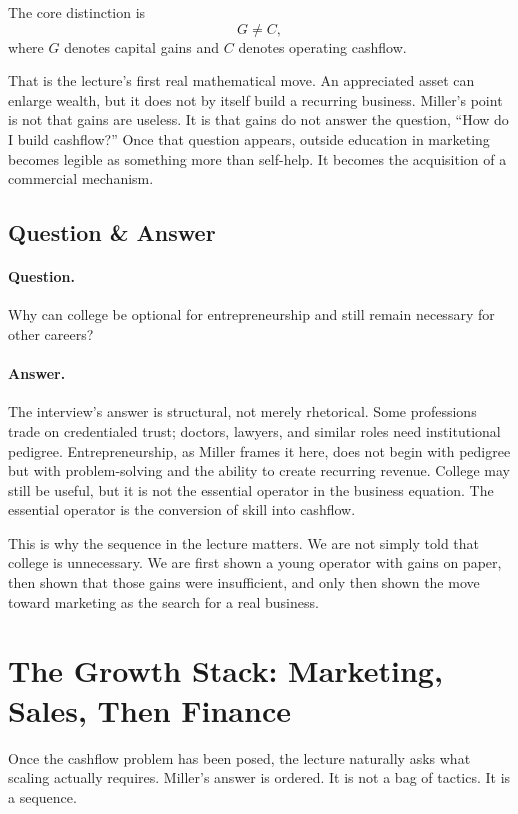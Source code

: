 The core distinction is
\begin{equation}
G \neq C,
\end{equation}
where \(G\) denotes capital gains and \(C\) denotes operating cashflow.

That is the lecture's first real mathematical move. An appreciated asset can enlarge wealth, but it does not by itself build a recurring business. Miller's point is not that gains are useless. It is that gains do not answer the question, ``How do I build cashflow?'' Once that question appears, outside education in marketing becomes legible as something more than self-help. It becomes the acquisition of a commercial mechanism.

\subsection{Question \& Answer}

\paragraph{Question.} Why can college be optional for entrepreneurship and still remain necessary for other careers?

\paragraph{Answer.} The interview's answer is structural, not merely rhetorical. Some professions trade on credentialed trust; doctors, lawyers, and similar roles need institutional pedigree. Entrepreneurship, as Miller frames it here, does not begin with pedigree but with problem-solving and the ability to create recurring revenue. College may still be useful, but it is not the essential operator in the business equation. The essential operator is the conversion of skill into cashflow.

This is why the sequence in the lecture matters. We are not simply told that college is unnecessary. We are first shown a young operator with gains on paper, then shown that those gains were insufficient, and only then shown the move toward marketing as the search for a real business.

\section{The Growth Stack: Marketing, Sales, Then Finance}

Once the cashflow problem has been posed, the lecture naturally asks what scaling actually requires. Miller's answer is ordered. It is not a bag of tactics. It is a sequence.

